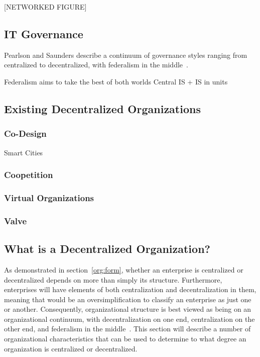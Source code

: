 [NETWORKED FIGURE]

\subsection{IT Governance}

Pearlson and Saunders describe a continuum of governance styles ranging from centralized to decentralized, with federalism in the middle~\cite{pearlson2009}. 

Federalism aims to take the best of both worlds
    Central IS + IS in units




\subsection{Existing Decentralized Organizations}

\subsubsection{Co-Design}
Smart Cities

\subsubsection{Coopetition}

\subsubsection{Virtual Organizations}

\subsubsection{Valve}

\subsection{What is a Decentralized Organization?}

As demonstrated in section~\ref{org:form}, whether an enterprise is centralized or decentralized depends on more than simply its structure. Furthermore, enterprises will have elements of both centralization and decentralization in them, meaning that would be an oversimplification to classify an enterprise as just one or another. Consequently, organizational structure is best viewed as being on an organizational continuum, with decentralization on one end, centralization on the other end, and federalism in the middle~\cite{pearlson2009}. This section will describe a number of organizational characteristics that can be used to determine to what degree an organization is centralized or decentralized. 

